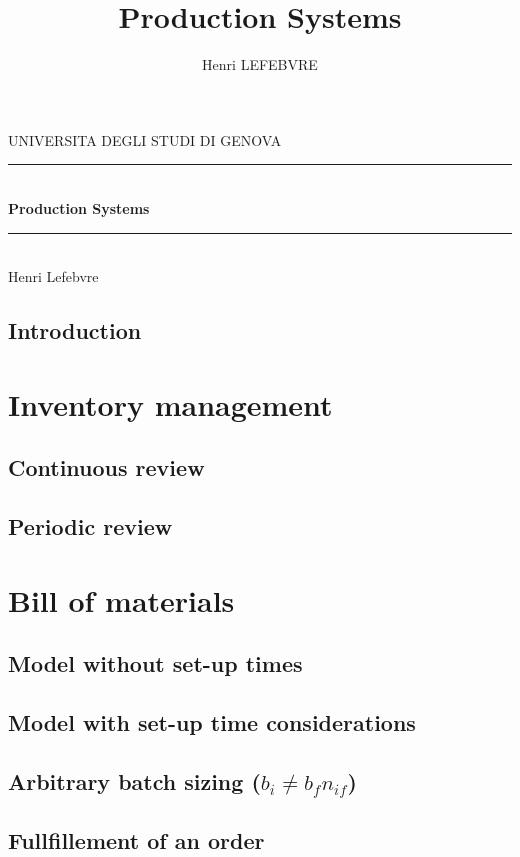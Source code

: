 \documentclass{report}
\title{Production Systems}
\author{Henri LEFEBVRE}
\begin{document}
    \hspace{\textwidth}
    \vspace{3cm}
    \begin{center}
        {\Large UNIVERSITA DEGLI STUDI DI GENOVA}
        \rule{\textwidth}{.3mm}\\
        \vspace{.5cm}
        {\huge\bfseries Production Systems }\\
        \vspace{.2cm}
        \rule{\textwidth}{.3mm}\\
        \vspace{1cm}
        {\large Henri Lefebvre}
    \end{center}
    \begin{figure}[h!]\thispagestyle{empty}\end{figure}
    \newpage

    \tableofcontents

    \setlength\parskip{0.5cm}

    \chapter*{Introduction}
    

    \part{Inventory management}
    \chapter{Continuous review}
    

    \chapter{Periodic review}
    

    \part{Bill of materials}
    \chapter{Model without set-up times}
    

    \chapter{Model with set-up time considerations}
    

    \chapter{Arbitrary batch sizing ($b_i \ne b_fn_{if}$)}
    

    \chapter{Fullfillement of an order}
    
\end{document}
